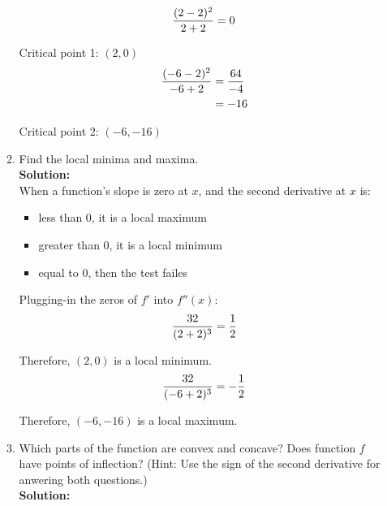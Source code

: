 \documentclass[a4paper]{article}
\begin{document}
\begin{enumerate}
\begin{enumerate}
\begin{align*}
	\frac{(2 - 2)^2}{2+2} = 0\notag\\
\end{align*}
	
Critical point 1: $(2,0)$\\

\begin{align*}
	\frac{(-6 - 2)^2}{-6+2} &= \frac{64}{-4}\notag\\
	&= -16\notag
\end{align*}

Critical point 2: $(-6,-16)$\\		
	
	
	
	
	\item Find the local minima and maxima.\\
	\textbf{Solution:}\\

When a function's slope is zero at $x$, and the second derivative at $x$ is:

\begin{itemize}
	\item less than 0, it is a local maximum
	\item greater than 0, it is a local minimum
	\item equal to 0, then the test failes
\end{itemize}

Plugging-in the zeros of $f'$ into $f''(x)$:\\

\begin{align*}
	\frac{32}{(2+2)^3} = \frac{1}{2}\notag\\
\end{align*}

Therefore, $(2,0)$ is a local minimum.\\

\begin{align*}
	\frac{32}{(-6+2)^3} = -\frac{1}{2}\notag\\
\end{align*}

Therefore, $(-6,-16)$ is a local maximum.\\


	
	
	\item Which parts of the function are convex and concave? Does function $f$ have points of inflection? (Hint: Use the sign of the second derivative for anwering both questions.)\\
	\textbf{Solution:}\\	
	

\end{enumerate}
\end{enumerate}
\end{document}
